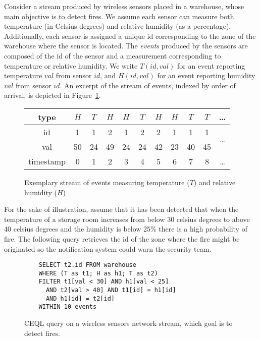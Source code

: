 \begin{example}\label{example:1}
Consider a stream produced by wireless sensors placed in a warehouse, whose main objective is to detect fires. We assume each sensor can measure both temperature (in Celsius degrees) and relative humidity (as a percentage). Additionally, each sensor is assigned a unique id corresponding to the zone of the warehouse where the sensor is located. The \emph{events} produced by the sensors are composed of the id of the sensor and a measurement corresponding to temperature or relative humidity. We write $T(id, val)$ for an event reporting temperature $val$ from sensor $id$, and $H(id, val)$ for an event reporting humidity $val$ from sensor $id$. An excerpt of the stream of events, indexed by order of arrival, is depicted in Figure~\ref{fig:stream}.

\begin{figure}[H]
  \centering
  \begin{tabular}{|c|c|c|c|c|c|c|c|c|c|c}\hline
    type  &$H$&$T$&$H$&$H$&$T$&$H$&$H$&$T$&$T$ & \ldots \\ \hline
    id  & 1 & 1 & 2 & 1 & 2 & 2 & 1 & 1 & 1 & \multirow{2}{*}{\ldots} \\
    val & 50 & 24& 49& 24& 24& 42& 23& 40& 45\\ \hline
    timestamp & 0 & 1 & 2 & 3 & 4 & 5 & 6 & 7 & 8 & \ldots \\ \hline
  \end{tabular}
  \caption{Exemplary stream of events measuring temperature ($T$) and relative humidity ($H$)}
  \label{fig:stream}
\end{figure}

For the sake of illustration, assume that it has been detected that when the temperature of a storage room increases from below 30 celsius degrees to above 40 celsius degrees and the humidity is below 25\% there is a high probability of fire. The following query retrieves the id of the zone where the fire might be originated so the notification system could warn the security team.

\begin{figure}[h!]
  \begin{verbatim}
    SELECT t2.id FROM warehouse
    WHERE (T as t1; H as h1; T as t2)
    FILTER t1[val < 30] AND h1[val < 25]
      AND t2[val > 40] AND t1[id] = h1[id]
      AND h1[id] = t2[id]
    WITHIN 10 events
  \end{verbatim}
  \caption{CEQL query on a wireless sensors network stream, which goal is to detect fires.}
  \label{fig:query:1}
\end{figure}


\end{example}
